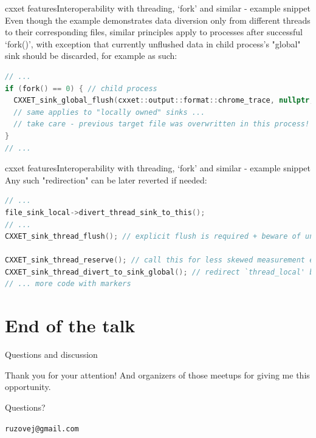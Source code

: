 \documentclass[aspectratio=169]{beamer}
\begin{document}
\begin{frame}[fragile]{cxxet features}{Interoperability with threading, `fork' and similar - example snippet}
    Even though the example demonstrates data diversion only from different threads to their corresponding files, similar principles apply to processes after successful `fork()', with exception that currently unflushed data in child process's "global" sink should be discarded, for example as such:

    \begin{lstlisting}[language=C++]
// ...
if (fork() == 0) { // child process
  CXXET_sink_global_flush(cxxet::output::format::chrome_trace, nullptr, false); // `false' - don't defer the flush
  // same applies to "locally owned" sinks ...
  // take care - previous target file was overwritten in this process!
}
// ...
    \end{lstlisting}

\end{frame}

\begin{frame}[fragile]{cxxet features}{Interoperability with threading, `fork' and similar - example snippet}
    Any such "redirection" can be later reverted if needed:

    \begin{lstlisting}[language=C++]
// ...
file_sink_local->divert_thread_sink_to_this();
// ...
CXXET_sink_thread_flush(); // explicit flush is required + beware of unterminated markers in current scope!

CXXET_sink_thread_reserve(); // call this for less skewed measurement explicitly
CXXET_sink_thread_divert_to_sink_global(); // redirect `thread_local' buffer back to the global one
// ... more code with markers
    \end{lstlisting}

\end{frame}



\section{End of the talk}

\begin{frame}{Questions and discussion}
    \begin{center}
        \Large Thank you for your attention! And organizers of those meetups for giving me this opportunity.

        \vspace{1cm}

        Questions?

        \vspace{1cm}

        \texttt{ruzovej@gmail.com}

    \end{center}

\end{frame}
\end{document}
